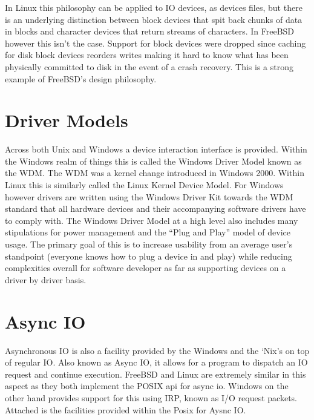 \documentclass[letterpaper,10pt,draftclsnofoot,onecolumn]{IEEEtran}
\begin{document}
In Linux this philosophy can be applied to IO devices, as devices files, but there is an underlying distinction between block devices that spit back chunks of data in blocks and character devices that return streams of characters. In FreeBSD however this isn’t the case. \cite{freebsdarch} Support for block devices were dropped since caching for disk block devices reorders writes making it hard to know what has been physically committed to disk in the event of a crash recovery. This is a strong example of FreeBSD’s design philosophy.\\
\newpage
\section{Driver Models}
Across both Unix and Windows a device interaction interface is provided. Within the Windows realm of things this is called the Windows Driver Model known as the WDM. The WDM was a kernel change introduced in Windows 2000. Within Linux this is similarly called the Linux Kernel Device Model. For Windows however drivers are written using the Windows Driver Kit towards the WDM standard that all hardware devices and their accompanying software drivers have to comply with. The Windows Driver Model at a high level also includes many stipulations for power management and the “Plug and Play” model of device usage. \cite{russinovich} The primary goal of this is to increase usability from an average user’s standpoint (everyone knows how to plug a device in and play) while reducing complexities overall for software developer as far as supporting devices on a driver by driver basis.\\
\section{Async IO}
Asynchronous IO is also a facility provided by the Windows and the ‘Nix’s on top of regular IO. Also known as Async IO, it allows for a program to dispatch an IO request and continue execution. FreeBSD and Linux are extremely similar in this aspect as they both implement the POSIX api for async io. Windows on the other hand provides support for this using IRP, known as I/O request packets. Attached is the facilities provided within the Posix for Aysnc IO.\\

\end{document}
